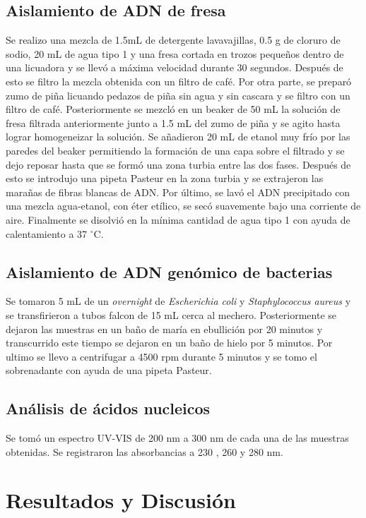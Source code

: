 \documentclass[fleqn,10pt]{SelfArx}
\begin{document}
	\subsection{Aislamiento de ADN de fresa}
	Se realizo una mezcla de 1.5mL de detergente lavavajillas, 0.5 g de cloruro de sodio, 20 mL de agua tipo 1 y una fresa cortada en trozos pequeños dentro de una licuadora y se llevó a máxima velocidad durante 30 segundos. Después de esto se filtro la mezcla obtenida con un filtro de café. Por otra parte, se preparó zumo de piña licuando pedazos de piña sin agua y sin cascara y se filtro con un filtro de café. Posteriormente se mezcló en un beaker de 50 mL la solución de fresa filtrada anteriormente junto a 1.5 mL del zumo de piña y se agito hasta lograr homogeneizar la solución. Se añadieron 20 mL de etanol muy frío por las paredes del beaker permitiendo la formación de una capa sobre el filtrado y se dejo reposar hasta que se formó una zona turbia entre las dos fases. Después de esto se introdujo una pipeta Pasteur en la zona turbia y se extrajeron las marañas de fibras blancas de ADN. Por último, se lavó el ADN precipitado con una mezcla agua-etanol, con éter etílico, se secó suavemente bajo una corriente de aire. Finalmente se disolvió en la mínima cantidad de agua tipo 1 con ayuda de calentamiento a 37 $^\circ$C.
	
	\subsection{Aislamiento de ADN genómico de bacterias}
	Se tomaron 5 mL de un \textit{overnight} de \textit{Escherichia coli} y \textit{Staphylococcus aureus} y se transfirieron a tubos falcon de 15 mL cerca al mechero. Posteriormente se dejaron las muestras en un baño de maría en ebullición por 20 minutos y transcurrido este tiempo se dejaron en un baño de hielo por 5 minutos. Por ultimo se llevo a centrifugar a 4500 rpm durante 5 minutos y se tomo el sobrenadante con ayuda de una pipeta Pasteur.
	
	\subsection{Análisis de ácidos nucleicos}
	Se tomó un espectro UV-VIS de 200 nm a 300 nm de cada una de las muestras obtenidas. Se registraron las absorbancias a 230 , 260 y 280 nm.
	
\section{Resultados y Discusi\'on}
\end{document}
